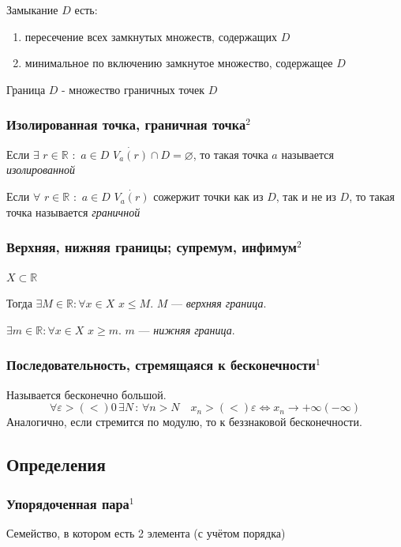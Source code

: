 \documentclass{article}
\def\dbl{\,\,}
\begin{document}
Замыкание $D$ есть: 
\begin{enumerate}
    \item пересечение всех замкнутых множеств, содержащих $D$
    \item минимальное по включению замкнутое множество, содержащее $D$
\end{enumerate}

Граница $D$ - множество граничных точек $D$

\subsubsection{Изолированная точка, граничная точка\texorpdfstring{$^2$}{}}
Если $\exists \dbl r \in \mathbb{R} \dbl : \dbl a \in D \dbl \dot{V_a(r)} \cap D = \varnothing$, то такая точка $a$ называется \textit{изолированной}

Если $\forall \dbl r \in \mathbb{R} \dbl : \dbl a \in D \dbl \dot{V_a(r)}$ сожержит точки как из $D$, так и не из $D$, то такая точка называется \textit{граничной}

\subsubsection{Верхняя, нижняя границы; супремум, инфимум\texorpdfstring{$^2$}{}}

$X \subset \mathbb{R}$

Тогда $\exists M \in \mathbb{R} : \forall x \in X \dbl x \le M$. $M$ --- \textit{верхняя граница}.

$\exists m \in \mathbb{R} : \forall x \in X \dbl x \ge m$. $m$ ---  \textit{нижняя граница}.

\subsubsection{Последовательность, стремящаяся к бесконечности\texorpdfstring{$^1$}{}}
Называется бесконечно большой.
$$
\forall \varepsilon >(<) 0 \, \exists N \,:\, \forall n > N \quad x_n >(<) \varepsilon \Leftrightarrow x_n \rightarrow +\infty(-\infty)
$$
Аналогично, если стремится по модулю, то к беззнаковой бесконечности. 

\newpage
\subsection{Определения}

\subsubsection{Упорядоченная пара\texorpdfstring{$^1$}{}}
Семейство, в котором есть 2 элемента (с учётом порядка)
\end{document}

